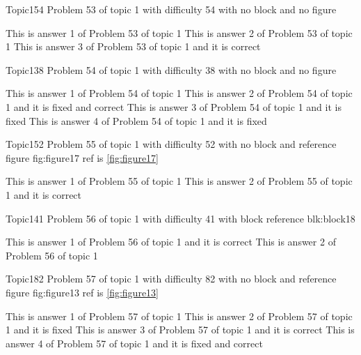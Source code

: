 \documentclass[master]{exam}
\begin{document}
\begin{problem}{Topic1}{54}
	Problem 53 of topic 1 with difficulty 54 with no block and no figure
	\begin{answers}
		\answer This is answer 1 of Problem 53 of topic 1 
		\answer This is answer 2 of Problem 53 of topic 1 
		\answer[correct] This is answer 3 of Problem 53 of topic 1 and it is correct
	\end{answers}
\end{problem}

\begin{problem}{Topic1}{38}
	Problem 54 of topic 1 with difficulty 38 with no block and no figure
	\begin{answers}
		\answer This is answer 1 of Problem 54 of topic 1 
		 This is answer 2 of Problem 54 of topic 1 and it is fixed and correct
		\answer[fixed] This is answer 3 of Problem 54 of topic 1 and it is fixed
		\answer[fixed] This is answer 4 of Problem 54 of topic 1 and it is fixed
	\end{answers}
\end{problem}

\begin{problem}{Topic1}{52}
	Problem 55 of topic 1 with difficulty 52 with no block and reference figure fig:figure17 ref is \ref{fig:figure17}
	\begin{answers}
		\answer This is answer 1 of Problem 55 of topic 1 
		\answer[correct] This is answer 2 of Problem 55 of topic 1 and it is correct
	\end{answers}
\end{problem}

\begin{problem}[requires=blk:block18]{Topic1}{41}
	Problem 56 of topic 1 with difficulty 41 with block reference blk:block18
	\begin{answers}
		\answer[correct] This is answer 1 of Problem 56 of topic 1 and it is correct
		\answer This is answer 2 of Problem 56 of topic 1 
	\end{answers}
\end{problem}

\begin{problem}{Topic1}{82}
	Problem 57 of topic 1 with difficulty 82 with no block and reference figure fig:figure13 ref is \ref{fig:figure13}
	\begin{answers}
		\answer This is answer 1 of Problem 57 of topic 1 
		\answer[fixed] This is answer 2 of Problem 57 of topic 1 and it is fixed
		\answer[correct] This is answer 3 of Problem 57 of topic 1 and it is correct
		 This is answer 4 of Problem 57 of topic 1 and it is fixed and correct
	\end{answers}
\end{problem}
\end{document}
